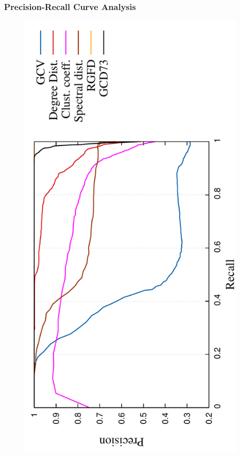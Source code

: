 \documentclass[11pt,xcolor=table]{beamer}
\begin{document}
\begin{frame}
  \frametitle{Precision-Recall Curve Analysis}
  
  \begin{figure}
    \centering 
    \includegraphics[scale=0.48, angle=-90]
  {../code/final_results/trade_2010_thresholded/eval_results/prec_rec_all_rnd_rew_02.pdf}
  \end{figure}

\end{frame}
\end{document}
